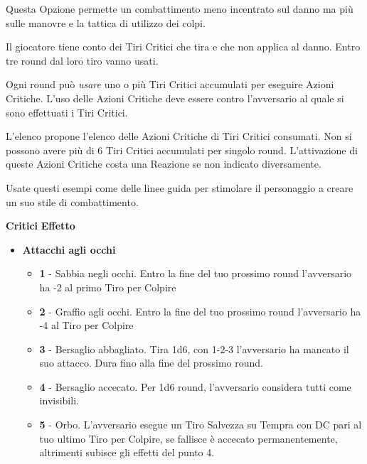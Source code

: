 \begin{multicols}{2}
Questa Opzione permette un combattimento meno incentrato sul danno ma più sulle manovre e la tattica di utilizzo dei colpi.

Il giocatore tiene conto dei Tiri Critici che tira e che non applica al danno. Entro tre round dal loro tiro vanno usati.

Ogni round può \emph{usare} uno o più Tiri Critici accumulati per eseguire Azioni Critiche. L'uso delle Azioni Critiche deve essere contro l'avversario al quale si sono effettuati i Tiri Critici.

L'elenco propone l'elenco delle Azioni Critiche di Tiri Critici consumati. Non si possono avere più di 6 Tiri Critici accumulati per singolo round.
L'attivazione di queste Azioni Critiche costa una Reazione se non indicato diversamente.

Usate questi esempi come delle linee guida per stimolare il personaggio a creare un suo stile di combattimento.

\medskip

\noindent\textbf{Critici} \hskip 0.5cm \textbf{Effetto}

\medskip

\begin{itemize}[leftmargin=*]
	\setlength{\itemsep}{0pt}
	
	\item \textbf{Attacchi agli occhi}
	\begin{itemize}[leftmargin=*]
		\setlength{\itemsep}{0pt}
		\item \textbf{1} - Sabbia negli occhi. Entro la fine del tuo prossimo round l'avversario ha -2 al primo Tiro per Colpire
	
		\item \textbf{2} - Graffio agli occhi. Entro la fine del tuo prossimo round l'avversario ha -4 al Tiro per Colpire
		
		\item \textbf{3} - Bersaglio abbagliato. Tira 1d6, con 1-2-3 l'avversario ha mancato il suo attacco. Dura fino alla fine del prossimo round.
		
		\item \textbf{4} - Bersaglio accecato. Per 1d6 round, l'avversario considera tutti come invisibili.
		
		\item \textbf{5} - Orbo. L'avversario esegue un Tiro Salvezza su Tempra con DC pari al tuo ultimo Tiro per Colpire, se fallisce è accecato permanentemente, altrimenti subisce gli effetti del punto 4.
	\end{itemize}
	

\end{itemize}
\end{multicols}
